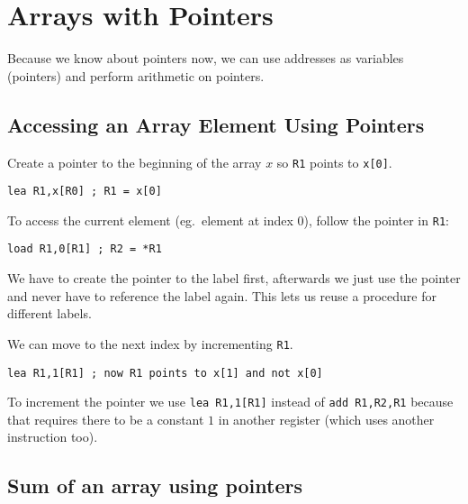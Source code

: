 \section{Arrays with Pointers}\label{sec:arrays_with_pointers}

Because we know about pointers now, we can use addresses as variables (pointers) and perform arithmetic on pointers.

\subsection{Accessing an Array Element Using Pointers}\label{sub:accessing_an_array_element_using_pointers}

Create a pointer to the beginning of the array \(x\) so \texttt{R1} points to \texttt{x[0]}.

\begin{verbatim}
lea R1,x[R0] ; R1 = x[0]
\end{verbatim}

\noindent
To access the current element (eg.\ element at index \(0\)), follow the pointer in \texttt{R1}:

\begin{verbatim}
load R1,0[R1] ; R2 = *R1
\end{verbatim}

\begin{note}
	We have to create the pointer to the label first, afterwards we just use the pointer and never have to reference the label again.
	This lets us reuse a procedure for different labels.
\end{note}

\noindent
We can move to the next index by incrementing \texttt{R1}.

\begin{verbatim}
lea R1,1[R1] ; now R1 points to x[1] and not x[0]
\end{verbatim}

\begin{note}
	To increment the pointer we use \texttt{lea R1,1[R1]} instead of \texttt{add R1,R2,R1} because that requires there to be a constant \(1\) in another register (which uses another instruction too).
\end{note}

\subsection{Sum of an array using pointers}\label{sub:sum_of_an_array_using_pointers}

